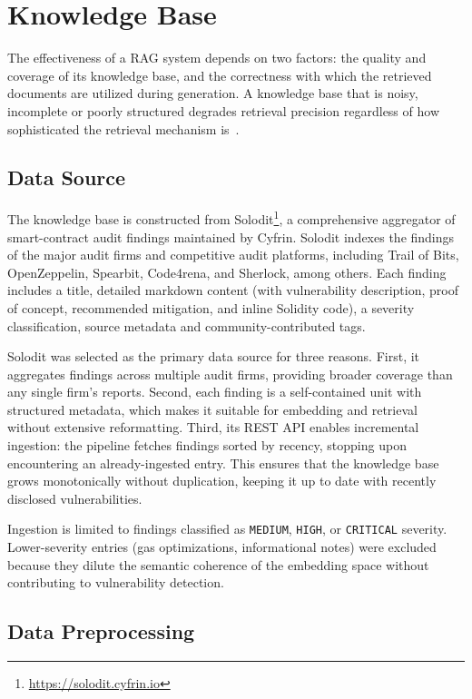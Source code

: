 \section{Knowledge Base}
\label{sec:knowledge-base}

The effectiveness of a RAG system depends on two factors: the quality and coverage of its knowledge base, and the correctness with which the retrieved documents are utilized during generation. A knowledge base that is noisy, incomplete or poorly structured degrades retrieval precision regardless of how sophisticated the retrieval mechanism is~\cite{manning2008irbook}.

\subsection{Data Source}
\label{subsec:solodit}

The knowledge base is constructed from Solodit\footnote{\url{https://solodit.cyfrin.io}}, a comprehensive aggregator of smart-contract audit findings maintained by Cyfrin. Solodit indexes the findings of the major audit firms and competitive audit platforms, including Trail of Bits, OpenZeppelin, Spearbit, Code4rena, and Sherlock, among others. Each finding includes a title, detailed markdown content (with vulnerability description, proof of concept, recommended mitigation, and inline Solidity code), a severity classification, source metadata and community-contributed tags.

Solodit was selected as the primary data source for three reasons. First, it aggregates findings across multiple audit firms, providing broader coverage than any single firm's reports. Second, each finding is a self-contained unit with structured metadata, which makes it suitable for embedding and retrieval without extensive reformatting. Third, its REST API enables incremental ingestion: the pipeline fetches findings sorted by recency, stopping upon encountering an already-ingested entry. This ensures that the knowledge base grows monotonically without duplication, keeping it up to date with recently disclosed vulnerabilities.

Ingestion is limited to findings classified as \texttt{MEDIUM}, \texttt{HIGH}, or \texttt{CRITICAL} severity. Lower-severity entries (gas optimizations, informational notes) were excluded because they dilute the semantic coherence of the embedding space without contributing to vulnerability detection.

\subsection{Data Preprocessing}
\label{subsec:preprocessing}

